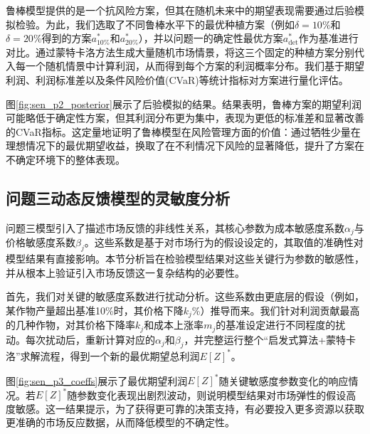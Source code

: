 鲁棒模型提供的是一个抗风险方案，但其在随机未来中的期望表现需要通过后验模拟检验。为此，我们选取了不同鲁棒水平下的最优种植方案（例如$\delta=10\%$和$\delta=20\%$得到的方案$a_{10\%}^*$和$a_{20\%}^*$），并以问题一的确定性最优方案$a_{\text{det}}^*$作为基准进行对比。通过蒙特卡洛方法生成大量随机市场情景，将这三个固定的种植方案分别代入每一个随机情景中计算利润，从而得到每个方案的利润概率分布。我们基于期望利润、利润标准差以及条件风险价值(CVaR)等统计指标对方案进行量化评估。


图\ref{fig:sen_p2_posterior}展示了后验模拟的结果。结果表明，鲁棒方案的期望利润可能略低于确定性方案，但其利润分布更为集中，表现为更低的标准差和显著改善的CVaR指标。这定量地证明了鲁棒模型在风险管理方面的价值：通过牺牲少量在理想情况下的最优期望收益，换取了在不利情况下风险的显著降低，提升了方案在不确定环境下的整体表现。

\subsection{问题三动态反馈模型的灵敏度分析}

问题三模型引入了描述市场反馈的非线性关系，其核心参数为成本敏感度系数$\alpha_j$与价格敏感度系数$\beta_j$。这些系数是基于对市场行为的假设设定的，其取值的准确性对模型结果有直接影响。本节分析旨在检验模型结果对这些关键行为参数的敏感性，并从根本上验证引入市场反馈这一复杂结构的必要性。

首先，我们对关键的敏感度系数进行扰动分析。这些系数由更底层的假设（例如，某作物产量超出基准10\%时，其价格下降$k_j$\%）推导而来。我们针对利润贡献最高的几种作物，对其价格下降率$k_j$和成本上涨率$m_j$的基准设定进行不同程度的扰动。每次扰动后，重新计算对应的$\alpha_j$和$\beta_j$，并完整运行整个“启发式算法+蒙特卡洛”求解流程，得到一个新的最优期望总利润$E[Z]^*$。


图\ref{fig:sen_p3_coeffs}展示了最优期望利润$E[Z]^*$随关键敏感度参数变化的响应情况。若$E[Z]^*$随参数变化表现出剧烈波动，则说明模型结果对市场弹性的假设高度敏感。这一结果提示，为了获得更可靠的决策支持，有必要投入更多资源以获取更准确的市场反应数据，从而降低模型的不确定性。

